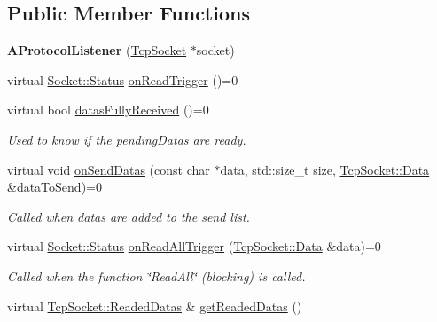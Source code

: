 \subsection*{Public Member Functions}
\begin{DoxyCompactItemize}
\item 
\hypertarget{classmognetwork_1_1protocol_1_1_a_protocol_listener_af67843ac5b9be56fcab208c9ca1b1871}{{\bfseries A\-Protocol\-Listener} (\hyperlink{classmognetwork_1_1_tcp_socket}{Tcp\-Socket} $\ast$socket)}\label{classmognetwork_1_1protocol_1_1_a_protocol_listener_af67843ac5b9be56fcab208c9ca1b1871}

\item 
virtual \hyperlink{classmognetwork_1_1_socket_aa187a8394ac0d6203af0ec7f021ca15f}{Socket\-::\-Status} \hyperlink{classmognetwork_1_1protocol_1_1_a_protocol_listener_a09fe5b96d8b2257cc86575a443918628}{on\-Read\-Trigger} ()=0
\item 
virtual bool \hyperlink{classmognetwork_1_1protocol_1_1_a_protocol_listener_a88fd602dec144a87f69f1848813334da}{datas\-Fully\-Received} ()=0
\begin{DoxyCompactList}\small\item\em Used to know if the pending\-Datas are ready. \end{DoxyCompactList}\item 
virtual void \hyperlink{classmognetwork_1_1protocol_1_1_a_protocol_listener_a9d079815b8de552c7b2f67ee50935422}{on\-Send\-Datas} (const char $\ast$data, std\-::size\-\_\-t size, \hyperlink{classmognetwork_1_1_tcp_socket_aa80d910649a16cedb6c98297e5893ed1}{Tcp\-Socket\-::\-Data} \&data\-To\-Send)=0
\begin{DoxyCompactList}\small\item\em Called when datas are added to the send list. \end{DoxyCompactList}\item 
virtual \hyperlink{classmognetwork_1_1_socket_aa187a8394ac0d6203af0ec7f021ca15f}{Socket\-::\-Status} \hyperlink{classmognetwork_1_1protocol_1_1_a_protocol_listener_a6baf7866e7401feb84dcb1aeaa93c33b}{on\-Read\-All\-Trigger} (\hyperlink{classmognetwork_1_1_tcp_socket_aa80d910649a16cedb6c98297e5893ed1}{Tcp\-Socket\-::\-Data} \&data)=0
\begin{DoxyCompactList}\small\item\em Called when the function \char`\"{}\-Read\-All\char`\"{} (blocking) is called. \end{DoxyCompactList}\item 
virtual \hyperlink{structmognetwork_1_1_tcp_socket_1_1_readed_datas}{Tcp\-Socket\-::\-Readed\-Datas} \& \hyperlink{classmognetwork_1_1protocol_1_1_a_protocol_listener_a55e8908247b0b93fa71f351e74dd3c2a}{get\-Readed\-Datas} ()

\end{DoxyCompactItemize}
